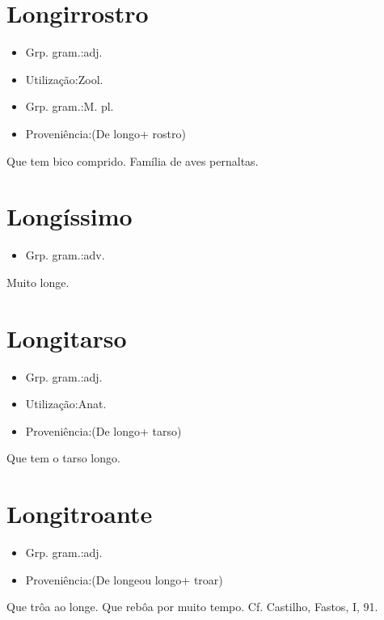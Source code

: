 \section{Longirrostro}
\begin{itemize}
\item {Grp. gram.:adj.}
\end{itemize}
\begin{itemize}
\item {Utilização:Zool.}
\end{itemize}
\begin{itemize}
\item {Grp. gram.:M. pl.}
\end{itemize}
\begin{itemize}
\item {Proveniência:(De \textunderscore longo\textunderscore  + \textunderscore rostro\textunderscore )}
\end{itemize}
Que tem bico comprido.
Família de aves pernaltas.
\section{Longíssimo}
\begin{itemize}
\item {Grp. gram.:adv.}
\end{itemize}
Muito longe.
\section{Longitarso}
\begin{itemize}
\item {Grp. gram.:adj.}
\end{itemize}
\begin{itemize}
\item {Utilização:Anat.}
\end{itemize}
\begin{itemize}
\item {Proveniência:(De \textunderscore longo\textunderscore  + \textunderscore tarso\textunderscore )}
\end{itemize}
Que tem o tarso longo.
\section{Longitroante}
\begin{itemize}
\item {Grp. gram.:adj.}
\end{itemize}
\begin{itemize}
\item {Proveniência:(De \textunderscore longe\textunderscore  ou \textunderscore longo\textunderscore  + \textunderscore troar\textunderscore )}
\end{itemize}
Que trôa ao longe.
Que rebôa por muito tempo. Cf. Castilho, \textunderscore Fastos\textunderscore , I, 91.
